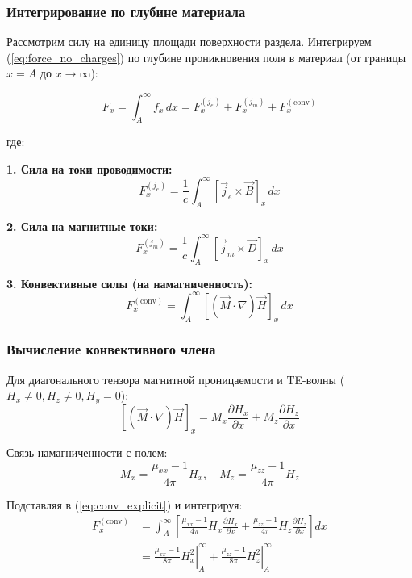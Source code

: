 \documentclass[a4paper,12pt]{article}
\begin{document}
\subsubsection{Интегрирование по глубине материала}

Рассмотрим силу на единицу площади поверхности раздела. Интегрируем (\ref{eq:force_no_charges}) по глубине проникновения поля в материал (от границы $x = A$ до $x \to \infty$):

\begin{equation}
F_x = \int_A^\infty f_x\,dx = F_x^{(j_e)} + F_x^{(j_m)} + F_x^{(\text{conv})}
\label{eq:integrated_force}
\end{equation}

где:

\textbf{1. Сила на токи проводимости:}
\begin{equation}
F_x^{(j_e)} = \frac{1}{c}\int_A^\infty [\vec{j}_e\times\vec{B}]_x\,dx
\label{eq:je_force}
\end{equation}

\textbf{2. Сила на магнитные токи:}
\begin{equation}
F_x^{(j_m)} = \frac{1}{c}\int_A^\infty [\vec{j}_m\times\vec{D}]_x\,dx
\label{eq:jm_force}
\end{equation}

\textbf{3. Конвективные силы (на намагниченность):}
\begin{equation}
F_x^{(\text{conv})} = \int_A^\infty \left[(\vec{M}\cdot\nabla)\vec{H}\right]_x\,dx
\label{eq:conv_force}
\end{equation}

\subsubsection{Вычисление конвективного члена}

Для диагонального тензора магнитной проницаемости и TE-волны ($H_x \neq 0, H_z \neq 0, H_y = 0$):
\begin{equation}
\left[(\vec{M}\cdot\nabla)\vec{H}\right]_x = M_x\frac{\partial H_x}{\partial x} + M_z\frac{\partial H_z}{\partial x}
\label{eq:conv_explicit}
\end{equation}

Связь намагниченности с полем:
\begin{equation}
M_x = \frac{\mu_{xx} - 1}{4\pi}H_x, \quad M_z = \frac{\mu_{zz} - 1}{4\pi}H_z
\label{eq:magnetization_constitutive}
\end{equation}

Подставляя в (\ref{eq:conv_explicit}) и интегрируя:
\begin{equation}
\begin{aligned}
F_x^{(\text{conv})} &= \int_A^\infty \left[\frac{\mu_{xx} - 1}{4\pi}H_x\frac{\partial H_x}{\partial x} + \frac{\mu_{zz} - 1}{4\pi}H_z\frac{\partial H_z}{\partial x}\right]dx \\
&= \left.\frac{\mu_{xx} - 1}{8\pi}H_x^2\right|_A^\infty + \left.\frac{\mu_{zz} - 1}{8\pi}H_z^2\right|_A^\infty
\end{aligned}
\label{eq:conv_integrated}
\end{equation}
\end{document}

